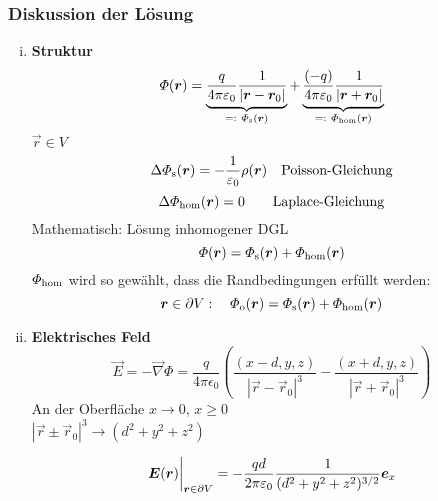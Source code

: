 \subsubsection{Diskussion der Lösung}
\begin{enumerate}[i)]
	\item \textbf{Struktur}
	$$\pofr = \underbrace{\frac{q}{4 \pi \epsilon_0} \frac{1}{|\vec{r}-\vec{r}_0|}}_{\eqdef\ \Phi_{\textrm{s}}(\vec{r})} + \underbrace{\frac{(-q)}{4 \pi \epsilon_0} \frac{1}{|\vec{r}+\vec{r}_0|}}_{\eqdef\ \Phi_{\textrm{hom}}(\vec{r})}$$ 
	$ \vec{r} \in V $
	\begin{equation*}
	\Delta \varPhi_{\textrm{s}}(\bm{r}) = - \frac{1}{\varepsilon_0} \rho(\bm{r}) \quad \textrm{Poisson-Gleichung}
	\end{equation*}
	\begin{equation*}
	\Delta \varPhi_{\textrm{hom}} (\bm{r}) = 0 \qquad \textrm{Laplace-Gleichung}
	\end{equation*}
	Mathematisch: Lösung inhomogener DGL
	\begin{equation*}
	\varPhi(\bm{r}) = \varPhi_{\textrm{s}}(\bm{r}) + \varPhi_{\textrm{hom}}(\bm{r})
	\end{equation*}
	$ \varPhi_{\textrm{hom}} $ wird so gewählt, dass die Randbedingungen erfüllt werden:
	\begin{equation*}
	\bm{r} \in \partial V: \quad \varPhi_{\textrm{o}} (\bm{r}) = \varPhi_{\textrm{s}}(\bm{r}) + \varPhi_{\textrm{hom}}(\bm{r})
	\end{equation*}	
	\item \textbf{Elektrisches Feld}
	\begin{equation*}
	\vec{E} = - \vec{\nabla} \Phi = \frac{q}{4 \pi \epsilon_0} \left(\frac{(x-d,y,z)}{|\vec{r} - \vec{r}_0|^3} - \frac{(x+d,y,z)}{|\vec{r} + \vec{r}_0|^3}\right)
	\end{equation*}
	An der Oberfläche $ x \to 0 $, $ x \ge 0 $\\
	$ |\vec{r} \pm \vec{r}_0|^3 \rightarrow (d^2 + y^2 + z^2) $\\
	\begin{minipage}{.5\linewidth}
		\begin{equation*}
		\bm{E}(\bm{r}) \bigg|_{\bm{r} \in \partial V} = - \frac{qd}{2 \pi \varepsilon_0} \frac{1}{(d^2 + y^2 + z^2) ^{3/2}} \bm{e}_x
		\end{equation*}
	\end{minipage}%
	\begin{minipage}{.5\linewidth}

\end{minipage}
\end{enumerate}
